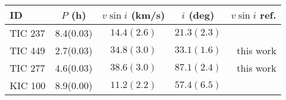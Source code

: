 \begin{tabular}{lcccr}
\hline\hline
      ID &    $P$ (h) & $v \sin i$ (km/s) &    $i$ (deg) &     $v\sin i$ ref. \\
\hline
 TIC 237 &  8.4(0.03) &       $14.4(2.6)$ &  $21.3(2.3)$ &  \citet{kraus2014} \\
 TIC 449 &  2.7(0.03) &       $34.8(3.0)$ &  $33.1(1.6)$ &          this work \\
 TIC 277 &  4.6(0.03) &       $38.6(3.0)$ &  $87.1(2.4)$ &          this work \\
 KIC 100 &  8.9(0.00) &       $11.2(2.2)$ &  $57.4(6.5)$ &  \citet{gizis2013} \\
\hline

\end{tabular}
